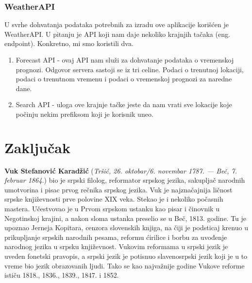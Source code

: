 \documentclass[12pt,oneside]{memoir}
\begin{document}
\subsection{WeatherAPI}

U svrhe dohvatanja podataka potrebnih za izradu ove aplikacije korišćen je WeatherAPI. U pitanju je API koji nam daje nekoliko krajnjih tačaka (eng. endpoint). Konkretno, mi smo koristili dva. 

\begin{enumerate}
    \item Forecast API - ovaj API nam služi za dohvatanje podataka o vremenskoj prognozi. Odgovor servera sastoji se iz tri celine. Podaci o trenutnoj lokaciji, podaci o trenutnom vremenu i podaci o vremenskoj prognozi za naredne dane.
    \item Search API - uloga ove krajnje tačke jeste da nam vrati sve lokacije koje počinju nekim prefiksom koji je korisnik uneo. 
\end{enumerate}

\chapter{Zaključak}
\pangrami

\pangrami

\literatura

\backmatter

\begin{biografija}
  \textbf{Vuk Stefanović Karadžić} (\emph{Tršić,
    26. oktobar/6. novembar 1787. — Beč, 7. februar 1864.}) bio je
  srpski filolog, reformator srpskog jezika, sakupljač narodnih
  umotvorina i pisac prvog rečnika srpskog jezika.  Vuk je
  najznačajnija ličnost srpske književnosti prve polovine XIX
  veka. Stekao je i nekoliko počasnih mastera.  Učestvovao je u
  Prvom srpskom ustanku kao pisar i činovnik u Negotinskoj krajini, a
  nakon sloma ustanka preselio se u Beč, 1813. godine. Tu je upoznao
  Jerneja Kopitara, cenzora slovenskih knjiga, na čiji je podsticaj
  krenuo u prikupljanje srpskih narodnih pesama, reformu ćirilice i
  borbu za uvođenje narodnog jezika u srpsku književnost. Vukovim
  reformama u srpski jezik je uveden fonetski pravopis, a srpski jezik
  je potisnuo slavenosrpski jezik koji je u to vreme bio jezik
  obrazovanih ljudi. Tako se kao najvažnije godine Vukove reforme
  ističu 1818., 1836., 1839., 1847. i 1852.
\end{biografija}
\end{document}
